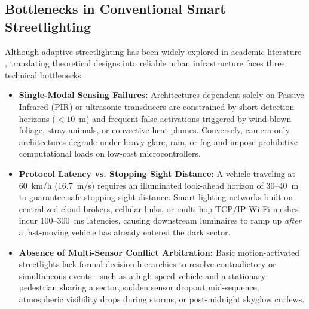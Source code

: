 \documentclass[11pt,a4paper]{article}
\begin{document}
\subsection{Bottlenecks in Conventional Smart Streetlighting}
Although adaptive streetlighting has been widely explored in academic literature \cite{castro2013smart,lau2015traffic}, translating theoretical designs into reliable urban infrastructure faces three technical bottlenecks:
\begin{itemize}
    \item \textbf{Single-Modal Sensing Failures:} Architectures dependent solely on Passive Infrared (PIR) or ultrasonic transducers are constrained by short detection horizons (\(<10\)~m) and frequent false activations triggered by wind-blown foliage, stray animals, or convective heat plumes. Conversely, camera-only architectures degrade under heavy glare, rain, or fog and impose prohibitive computational loads on low-cost microcontrollers.
    \item \textbf{Protocol Latency vs. Stopping Sight Distance:} A vehicle traveling at 60~km/h (16.7~m/s) requires an illuminated look-ahead horizon of 30--40~m to guarantee safe stopping sight distance. Smart lighting networks built on centralized cloud brokers, cellular links, or multi-hop TCP/IP Wi-Fi meshes incur 100--300~ms latencies, causing downstream luminaires to ramp up \textit{after} a fast-moving vehicle has already entered the dark sector.
    \item \textbf{Absence of Multi-Sensor Conflict Arbitration:} Basic motion-activated streetlights lack formal decision hierarchies to resolve contradictory or simultaneous events---such as a high-speed vehicle and a stationary pedestrian sharing a sector, sudden sensor dropout mid-sequence, atmospheric visibility drops during storms, or post-midnight skyglow curfews.
\end{itemize}
\end{document}
